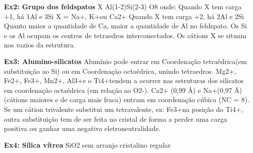 \vspace{100px}

\textbf{Ex2: Grupo dos feldspatos}
X Al(1-2)Si(2-3) O8
onde: Quando X tem carga +1, há 1Al e 3Si
X = Na+, K+ou Ca2+ Quando X tem carga +2, há 2Al e 2Si
Quanto maior a quantidade de Ca, maior a quantidade de Al no feldspato.
Os Si e os Al ocupam os centros de tetraedros interconectados.
Os cátions X se situam nos vazios da estrutura.


\textbf{Ex3: Alumino-silicatos}
Alumínio pode entrar em Coordenação tetraédrica(em substituição ao Si) ou em Coordenação octaédrica, unindo tetraedros.
Mg2+, Fe2+, Fe3+, Mn2+, Al3+e o Ti4+tendem a ocorrer nas estruturas dos silicatos em coordenação octaédrica (em relação ao O2-).
Ca2+ (0,99 Å) e Na+(0,97 Å) (cátions maiores e de carga mais fraca) entram em coordenação cúbica (NC = 8).
Se um cátion trivalente substitui um tetravalente, ex: Fe3+na posição do Ti4+, outra substituição tem de ser feita no cristal de forma a perder uma carga positiva ou ganhar uma negativa eletroneutralidade.


\textbf{Ex4: Sílica vítrea}
SiO2 sem arranjo cristalino regular



